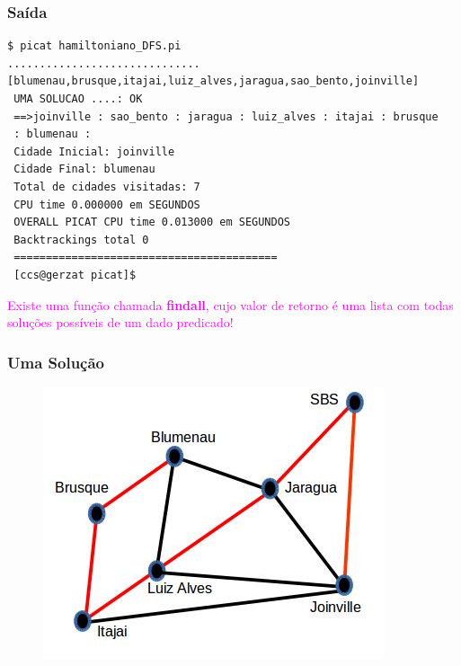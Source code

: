 \begin{frame}[fragile]
\frametitle{Saída}

\begin{footnotesize}
\begin{verbatim}
$ picat hamiltoniano_DFS.pi 
..............................
[blumenau,brusque,itajai,luiz_alves,jaragua,sao_bento,joinville] 
 UMA SOLUCAO ....: OK
 ==>joinville : sao_bento : jaragua : luiz_alves : itajai : brusque 
 : blumenau : 
 Cidade Inicial: joinville 
 Cidade Final: blumenau
 Total de cidades visitadas: 7
 CPU time 0.000000 em SEGUNDOS 
 OVERALL PICAT CPU time 0.013000 em SEGUNDOS 
 Backtrackings total 0  
 =========================================
 [ccs@gerzat picat]$ 
\end{verbatim}
\end{footnotesize}

\begin{center}
\textcolor{magenta}{Existe uma função chamada \textbf{findall}, cujo valor
de retorno é uma lista com todas soluções possíveis de um dado predicado!}
\end{center}

\end{frame}



\begin{frame}[fragile]
\frametitle{Uma Soluç\~ao}

\begin{figure}[!htb]
\centering
\includegraphics[width=.8\textwidth, height=0.567\textheight]{figures/mapa02SC.jpg}
\end{figure}

\end{frame}





